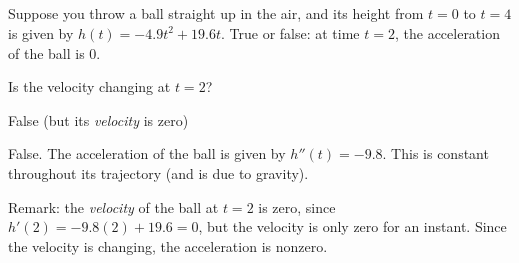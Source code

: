 %
%
\subsection*{\Conceptual}


\begin{Mquestion}
Suppose you throw a ball straight up in the air, and its height from $t=0$ to $t=4$
is given by $h(t)=-4.9t^2+19.6t$. True or false: at time $t=2$, the acceleration of the ball is 0.
\end{Mquestion}
\begin{hint}
Is the velocity changing at $t=2$?
\end{hint}
\begin{answer}
False (but its \emph{velocity} is zero)
\end{answer}
\begin{solution}
False. The acceleration of the ball is given by $h''(t)=-9.8$. This is constant throughout its trajectory (and is due to gravity).

Remark: the \emph{velocity} of the ball at $t=2$ is zero, since $h'(2)=-9.8(2)+19.6=0$, but the velocity is only zero for an instant. Since the velocity is changing, the acceleration is nonzero.
\end{solution}


